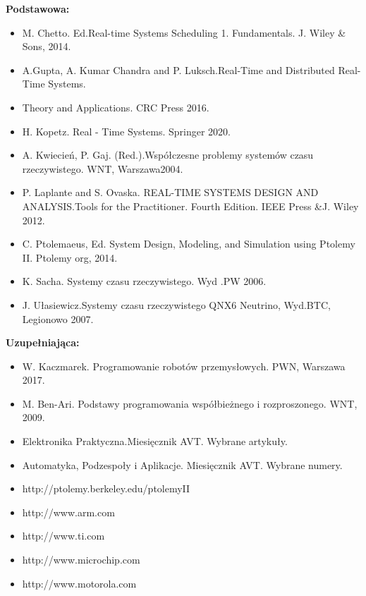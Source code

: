 \documentclass[12pt, a4paper]{article}
\begin{document}
\textbf{Podstawowa:}
\begin{itemize}
  \item M. Chetto. Ed.Real-time Systems Scheduling 1. Fundamentals. J. Wiley \& Sons, 2014.
  \item A.Gupta, A. Kumar Chandra and P. Luksch.Real-Time and Distributed Real-Time Systems.
  \item Theory and Applications. CRC Press 2016.
  \item H. Kopetz. Real - Time Systems. Springer 2020.
  \item A. Kwiecień, P. Gaj. (Red.).Współczesne problemy systemów czasu rzeczywistego. WNT, Warszawa2004.
  \item P. Laplante and S. Ovaska. REAL-TIME SYSTEMS DESIGN AND ANALYSIS.Tools for the Practitioner. Fourth Edition. IEEE Press \&J. Wiley 2012.
  \item C. Ptolemaeus, Ed. System Design, Modeling, and Simulation using Ptolemy II. Ptolemy org, 2014.
  \item K. Sacha. Systemy czasu rzeczywistego. Wyd .PW  2006.
  \item J. Ułasiewicz.Systemy czasu rzeczywistego QNX6 Neutrino, Wyd.BTC, Legionowo 2007.
\end{itemize}

\textbf{Uzupełniająca:}
\begin{itemize}
  \item W. Kaczmarek. Programowanie robotów przemysłowych. PWN, Warszawa 2017.
  \item M. Ben-Ari. Podstawy programowania współbieżnego i rozproszonego. WNT, 2009.
  \item Elektronika Praktyczna.Miesięcznik AVT. Wybrane artykuły.
  \item Automatyka, Podzespoły i Aplikacje. Miesięcznik AVT. Wybrane numery.
  \item http://ptolemy.berkeley.edu/ptolemyII
  \item http://www.arm.com
  \item http://www.ti.com
  \item http://www.microchip.com
  \item http://www.motorola.com
\end{itemize}
\end{document}
